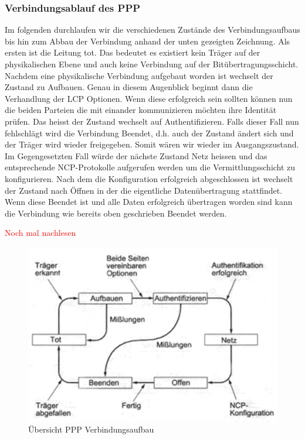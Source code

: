 \documentclass[12pt, a4paper, ngerman]{article}
\begin{document}




\subsubsection{Verbindungsablauf des PPP}

Im folgenden durchlaufen wir die verschiedenen Zustände des Verbindungsaufbaus bis hin zum Abbau der Verbindung anhand der unten gezeigten Zeichnung.
Als ersten ist die Leitung tot. Das bedeutet es existiert kein Träger auf der physikalischen Ebene und auch keine Verbindung auf der Bitübertragungsschicht.
Nachdem eine physikalische Verbindung aufgebaut worden ist wechselt der Zustand zu Aufbauen. Genau in diesem Augenblick beginnt dann die Verhandlung der LCP Optionen. Wenn diese erfolgreich sein sollten können nun die beiden Parteien die mit einander kommunizieren möchten ihre Identität prüfen. Das heisst der Zustand wechselt auf Authentifizieren. Falls dieser Fall nun fehlschlägt wird die Verbindung Beendet, d.h. auch der Zustand ändert sich und der Träger wird wieder freigegeben. Somit wären wir wieder im Ausgangszustand. Im Gegengesetzten Fall würde der nächste Zustand Netz heissen und das entsprechende NCP-Protokolle aufgerufen werden um die Vermittlungsschicht zu konfigurieren. Nach dem die Konfiguration erfolgreich abgeschlossen ist wechselt der Zustand nach Öffnen in der die eigentliche Datenübertragung stattfindet. Wenn diese Beendet ist und alle Daten erfolgreich übertragen worden sind kann die Verbindung wie bereits oben geschrieben Beendet werden.

\large{\textcolor{red}{Noch mal nachlesen}}

\begin{figure}[H]
	\centering
	\includegraphics[width=1\textwidth]{Grafiken/ppp.jpg}	
	\caption{Übersicht PPP Verbindungsaufbau \cite{*}}
	\label{aufbau_ppp-verbindung}
\end{figure}
\end{document}
